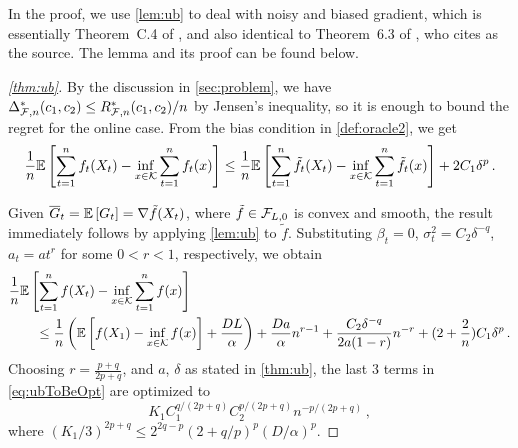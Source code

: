 In the proof, we use \cref{lem:ub} to deal with noisy and biased gradient, which is essentially Theorem~C.4 of \cite{MahdaviPhd:2014}, and also identical to Theorem~6.3 of \cite{Bu:Convex14}, who cites \cite{Dekel:minibatch12} as the source.
The lemma and its proof can be found below.

\begin{proof}[\cref{thm:ub}]
By the discussion in \cref{sec:problem}, we have $\Delta^*_{\mathcal{F},n}(c_1,c_2) \le R^*_{\mathcal{F},n}(c_1,c_2)/n$ by Jensen's inequality, so it is enough to bound the regret for the online case.
From the bias condition in \cref{def:oracle2}, we get
\begin{align*}
 \frac{1}{n} \mathbb{E}\left[ \sum_{t=1}^n f_t(X_t) - \inf_{x \in \mathcal{K}}\sum_{t=1}^n f_t(x) \right]
 \le \frac{1}{n}\mathbb{E}\left[ \sum_{t=1}^n \tilde{f}_t(X_t) - \inf_{x \in \mathcal{K}}\sum_{t=1}^n \tilde{f}_t(x) \right] +2C_1 \delta^p
 \,.
\end{align*}

Given $\overline{G}_t=\mathbb{E}\left[G_t\right] = \nabla \tilde{f}(X_t)$, where $\tilde{f}\in \mathcal{F}_{L,0}$ is convex and smooth,
the result immediately follows by applying \cref{lem:ub} to $\tilde{f}$.
Substituting
 $\beta_t = 0$, $\sigma^2_t = C_2 \delta^{-q}$, $a_t=a t^r$ for some $0<r<1$, respectively, we obtain
 \begin{align}
\MoveEqLeft
\frac{1}{n} \EE{ \sum_{t=1}^n f( X_t) - \inf_{x \in \cK} \sum_{t=1}^n f(x)} \nonumber \\
&\le \frac{1}{n}\left(\EE{f(X_1)-\inf_{x \in \cK}f(x)}+\frac{DL}{\alpha}  \right) %
+\frac{Da}{\alpha} n^{r-1}+\dfrac{C_2 \delta^{-q}}{2a(1-r)}n^{-r}+ (2+\dfrac{2}{n})C_1\delta^p \,.
\label{eq:ubToBeOpt}
 \end{align}
 Choosing $r = \frac{p+q}{2p+q}$, and $a$, $\delta$ as stated in \cref{thm:ub}, the last $3$ terms in \eqref{eq:ubToBeOpt} are optimized to
 \[
 K_1 C_1^{q/(2p+q)} C_2^{p/(2p+q)} n ^{-p/(2p+q)} \,,
 \]
 where
 $(K_1/3)^{2p+q} \le 2^{2q-p}\left(2+q/p \right)^p \left(D/\alpha\right)^{p}$.


\end{proof}
